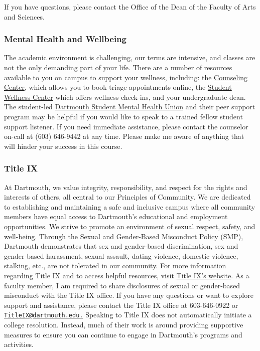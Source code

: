 \documentclass[
  11pt,
]{article}
\begin{document}
If you have questions, please contact the Office of the Dean of the
Faculty of Arts and Sciences.

\subsubsection{Mental Health and
Wellbeing}\label{mental-health-and-wellbeing}

The academic environment is challenging, our terms are intensive, and
classes are not the only demanding part of your life. There are a number
of resources available to you on campus to support your wellness,
including: the \href{https://www.dartmouth.edu/~chd/}{Counseling
Center}, which allows you to book triage appointments online, the
\href{https://students.dartmouth.edu/wellness-center/wellness-mindfulness/transition-resources-and-information/virtual-student-wellness-center}{Student
Wellness Center} which offers wellness check-ins, and your undergraduate
dean. The student-led
\href{https://journeys.dartmouth.edu/mentalhealthunion/peer-support/}{Dartmouth
Student Mental Health Union} and their peer support program may be
helpful if you would like to speak to a trained fellow student support
listener. If you need immediate assistance, please contact the counselor
on-call at (603) 646-9442 at any time. Please make me aware of anything
that will hinder your success in this course.

\subsubsection{Title IX}\label{title-ix}

At Dartmouth, we value integrity, responsibility, and respect for the
rights and interests of others, all central to our Principles of
Community. We are dedicated to establishing and maintaining a safe and
inclusive campus where all community members have equal access to
Dartmouth's educational and employment opportunities. We strive to
promote an environment of sexual respect, safety, and well-being.
Through the Sexual and Gender-Based Misconduct Policy (SMP), Dartmouth
demonstrates that sex and gender-based discrimination, sex and
gender-based harassment, sexual assault, dating violence, domestic
violence, stalking, etc., are not tolerated in our community. For more
information regarding Title IX and to access helpful resources, visit
\href{https://sexual-respect.dartmouth.edu/}{Title IX's website}. As a
faculty member, I am required to share disclosures of sexual or
gender-based misconduct with the Title IX office. If you have any
questions or want to explore support and assistance, please contact the
Title IX office at 603-646-0922 or
\href{mailto:TitleIX@dartmouth.edu.}{\nolinkurl{TitleIX@dartmouth.edu.}}
Speaking to Title IX does not automatically initiate a college
resolution. Instead, much of their work is around providing supportive
measures to ensure you can continue to engage in Dartmouth's programs
and activities.
\end{document}
